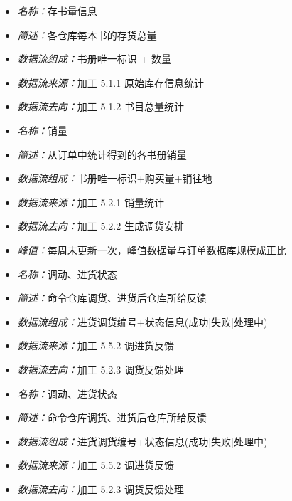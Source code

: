 \vspace{-1mm}

\begin{itemize}
\item \textit{名称：}存书量信息
	\item \textit{简述：}各仓库每本书的存货总量
	\item \textit{数据流组成：}书册唯一标识 + 数量
	\item \textit{数据流来源：}加工 5.1.1 原始库存信息统计
	\item \textit{数据流去向：}加工 5.1.2 书目总量统计
\end{itemize}

\vspace{-1mm}

\begin{itemize}
\item \textit{名称：}销量
	\item \textit{简述：}从订单中统计得到的各书册销量
	\item \textit{数据流组成：}书册唯一标识+购买量+销往地
	\item \textit{数据流来源：}加工 5.2.1 销量统计
	\item \textit{数据流去向：}加工 5.2.2 生成调货安排
	\item \textit{峰值：}每周末更新一次，峰值数据量与订单数据库规模成正比
\end{itemize}

\vspace{-1mm}

\begin{itemize}
\item \textit{名称：}调动、进货状态
	\item \textit{简述：}命令仓库调货、进货后仓库所给反馈
	\item \textit{数据流组成：}进货调货编号+状态信息(成功|失败|处理中)
	\item \textit{数据流来源：}加工 5.5.2 调进货反馈
	\item \textit{数据流去向：}加工 5.2.3 调货反馈处理
\end{itemize}

\vspace{-1mm}

\begin{itemize}
\item \textit{名称：}调动、进货状态
	\item \textit{简述：}命令仓库调货、进货后仓库所给反馈
	\item \textit{数据流组成：}进货调货编号+状态信息(成功|失败|处理中)
	\item \textit{数据流来源：}加工 5.5.2 调进货反馈
	\item \textit{数据流去向：}加工 5.2.3 调货反馈处理
\end{itemize}

